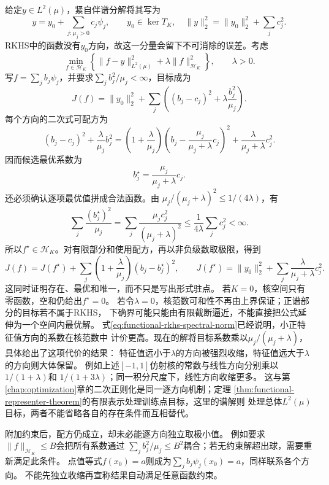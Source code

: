 给定$y\in L^2(\mu)$，紧自伴谱分解将其写为
\[
 y=y_0+\sum_{j:\mu_j>0}c_j\psi_j,\qquad
 y_0\in\ker T_K,\quad
 \lVert y\rVert_2^2=\lVert y_0\rVert_2^2+\sum_jc_j^2.
\]
RKHS中的函数没有$y_0$方向，故这一分量会留下不可消除的误差。考虑
\[
  \min_{f\in\mathcal{H}_K}
  \left\{
    \lVert f-y\rVert_{L^2(\mu)}^2
    +
    \lambda\lVert f\rVert_{\mathcal{H}_K}^2
  \right\},
  \qquad \lambda>0.
\]
写$f=\sum_jb_j\psi_j$，并要求$\sum_jb_j^2/\mu_j<\infty$，目标成为
\[
 J(f)=\lVert y_0\rVert_2^2+
 \sum_j\left((b_j-c_j)^2+\lambda\frac{b_j^2}{\mu_j}\right).
\]
每个方向的二次式可配方为
\[
 (b_j-c_j)^2+\frac{\lambda}{\mu_j}b_j^2
 =\left(1+\frac{\lambda}{\mu_j}\right)
   \left(b_j-\frac{\mu_j}{\mu_j+\lambda}c_j\right)^2
   +\frac{\lambda}{\mu_j+\lambda}c_j^2.
\]
因而候选最优系数为
\begin{equation}
  b_j^\star
  =
  \frac{\mu_j}{\mu_j+\lambda}c_j.
  \label{eq:functional-spectral-shrinkage}
\end{equation}
还必须确认逐项最优值拼成合法函数。由
$\mu_j/(\mu_j+\lambda)^2\leq1/(4\lambda)$，有
\[
 \sum_j\frac{(b_j^\star)^2}{\mu_j}
 =\sum_j\frac{\mu_j c_j^2}{(\mu_j+\lambda)^2}
 \leq\frac1{4\lambda}\sum_jc_j^2<\infty.
\]
所以$f^\star\in\mathcal H_K$。对有限部分和使用配方，再以非负级数取极限，得到
\[
 J(f)=J(f^\star)+
 \sum_j\left(1+\frac{\lambda}{\mu_j}\right)(b_j-b_j^\star)^2,\qquad
 J(f^\star)=\lVert y_0\rVert_2^2+
 \sum_j\frac{\lambda}{\mu_j+\lambda}c_j^2.
\]
这同时证明存在、最优和唯一，而不只是写出形式驻点。
若$K=0$，核空间只有零函数，空和仍给出$f^\star=0$。
若令$\lambda=0$，核范数可和性不再由上界保证；正谱部分的目标若不属于RKHS，
下确界可能只能由有限截断逼近，不能直接把公式延伸为一个空间内最优解。
式\eqref{eq:functional-rkhs-spectral-norm}已经说明，小正特征值方向的系数在核范数中
计价更高。现在的解将目标系数乘以$\mu_j/(\mu_j+\lambda)$，具体给出了这项代价的结果：
特征值远小于$\lambda$的方向被强烈收缩，特征值远大于$\lambda$的方向则大体保留。
例如上述$[-1,1]$仿射核的常数与线性方向分别乘以$1/(1+\lambda)$和
$1/(1+3\lambda)$；同一积分尺度下，线性方向收缩更多。
这与第\ref{chap:optimization}章的二次正则化是同一逐方向机制；定理
\ref{thm:functional-representer-theorem}的有限表示处理训练点目标，这里的谱解则
处理总体$L^2(\mu)$目标，两者不能省略各自的存在条件而互相替代。

附加约束后，配方仍成立，却未必能逐方向独立取极小值。
例如要求$\lVert f\rVert_{\mathcal H_K}\leq B$会把所有系数通过
$\sum_jb_j^2/\mu_j\leq B^2$耦合；若无约束解超出球，需要重新满足此条件。
点值等式$f(x_0)=a$则成为$\sum_jb_j\psi_j(x_0)=a$，同样联系各个方向。
不能先独立收缩再宣称结果自动满足任意函数约束。

